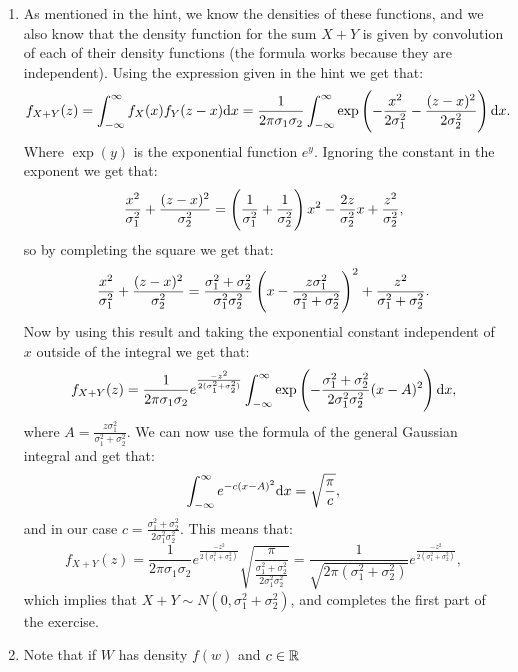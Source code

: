 \documentclass[11pt,a4paper]{article}
\begin{document}
\begin{solution} \phantom{}
  \begin{enumerate}
    \item[(1)] As mentioned in the hint,
      we know the densities of these functions,
      and we also know that the density function for the sum $X + Y$
      is given by convolution of each of their density functions
      (the formula works because they are independent).
      Using the expression given in the hint we get that:
      \[
        f_{X+Y}(z) =
        \int_{-\infty}^{\infty} f_{X}(x) f_{Y}(z-x) \dx =
        \frac{1}{2 \pi \sigma_1 \sigma_2} \int_{-\infty}^{\infty}
        \exp\del{-\frac{x^2}{2\sigma_1^2} - \frac{(z - x)^2}{2\sigma_2^2}} \dx.
      \]
      Where $\exp(y)$ is the exponential function $e^y$.
      Ignoring the constant in the exponent we get that:
      \[
        \frac{x^2}{\sigma_1^2} + \frac{(z - x)^2}{\sigma_2^2} =
        \del{\frac{1}{\sigma_1^2} + \frac{1}{\sigma_2^2}} x^2
          -\frac{2z}{\sigma_2^2} x + \frac{z^2}{\sigma_2^2},
      \]
      so by completing the square we get that:
      \[
        \frac{x^2}{\sigma_1^2} + \frac{(z - x)^2}{\sigma_2^2} =
        \frac{\sigma_1^2 + \sigma_2^2}{\sigma_1^2 \sigma_2^2}
          \del{x - \frac{z \sigma_1^2}{\sigma_1^2 + \sigma_2^2}}^2 +
          \frac{z^2}{\sigma_1^2 + \sigma_2^2}.
      \]
      Now by using this result and taking the exponential constant
      independent of $x$
      outside of the integral we get that:
      \[
        f_{X+Y}(z) =
        \frac{1}{2 \pi \sigma_1 \sigma_2}
          e^{\frac{-z^2}{2(\sigma_1^2 + \sigma_2^2)}}
          \int_{-\infty}^{\infty}
          \exp\del{-\frac{\sigma_1^2 + \sigma_2^2}{2 \sigma_1^2 \sigma_2^2}(x - A)^2} \dx,
      \]
      where $A = \frac{z \sigma_1^2}{\sigma_1^2 + \sigma_2^2}$.
      We can now use the formula of the general Gaussian integral and
      get that:
      \[
        \int_{-\infty}^{\infty} e^{-c(x - A)^2} \dx =
        \sqrt{\frac{\pi}{c}},
      \]
      and in our
      case $c = \frac{\sigma_1^2 + \sigma_2^2}{2 \sigma_1^2 \sigma_2^2}$.
      This means that:
      \[
        f_{X+Y}(z) =
        \frac{1}{2 \pi \sigma_1 \sigma_2}
          e^{\frac{-z^2}{2(\sigma_1^2 + \sigma_2^2)}}
          \sqrt{\frac{\pi}{\frac{\sigma_1^2 + \sigma_2^2}{2 \sigma_1^2 \sigma_2^2}}} =
          \frac{1}{\sqrt{2\pi (\sigma_1^2 + \sigma_2^2)}}
          e^{\frac{-z^2}{2(\sigma_1^2 + \sigma_2^2)}},
      \]
      which implies that $X + Y \sim N(0,\sigma_1^2 + \sigma_2^2)$,
      and completes the first part of the exercise.
    \item[(2)] Note that if $W$ has density $f(w)$ and $c \in \mathbb{R}$

\end{enumerate}
\end{solution}
\end{document}

